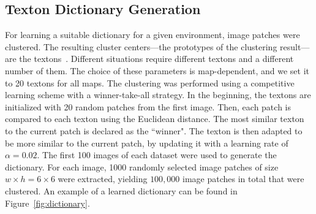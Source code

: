 \subsection{Texton Dictionary Generation}
\label{sec:text-dict-gener}

For learning a suitable dictionary for a given environment, image patches were clustered. The resulting cluster centers---the prototypes of the
clustering result---are the textons~\cite{varma2003texture}. Different situations require different textons and a different number of them. The choice of these parameters is map-dependent, and we set it to 20 textons for all maps. The clustering was performed using a competitive learning scheme with a winner-take-all strategy. 
In the beginning, the textons are initialized with 20 random patches from the first image. Then, each patch is compared to each texton using the Euclidean distance. The most similar texton to the current patch is declared as the ``winner". The texton is then adapted to be more similar to the current patch, by updating it with a learning rate of $\alpha = 0.02$. The first 100 images of each dataset were used to generate the dictionary. For each image, 1000 randomly selected image patches of size $w \times h = 6 \times 6$ were extracted, yielding $100,000$ image patches in total that were clustered.  An example of a learned dictionary can be found in Figure~\ref{fig:dictionary}.
